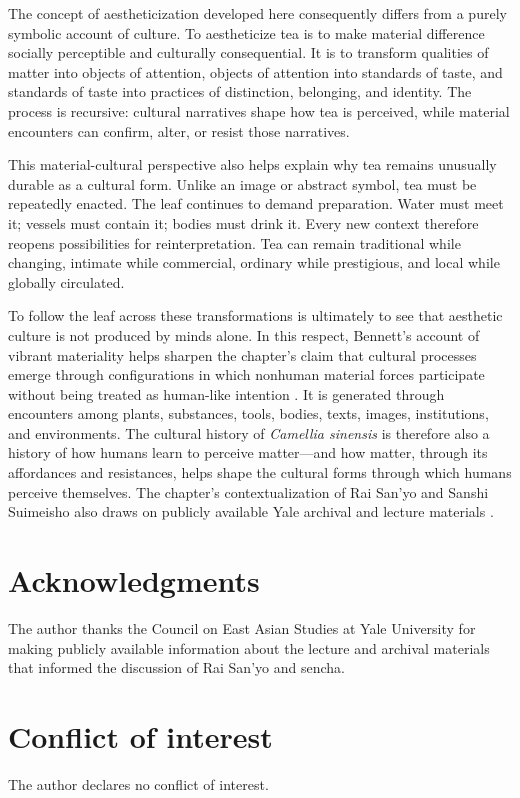 \documentclass[numbers]{IntechOpen-Book}
\begin{document}
\begin{backmatter}
The concept of aestheticization developed here consequently differs from a purely symbolic account of culture. To aestheticize tea is to make material difference socially perceptible and culturally consequential. It is to transform qualities of matter into objects of attention, objects of attention into standards of taste, and standards of taste into practices of distinction, belonging, and identity. The process is recursive: cultural narratives shape how tea is perceived, while material encounters can confirm, alter, or resist those narratives.

This material-cultural perspective also helps explain why tea remains unusually durable as a cultural form. Unlike an image or abstract symbol, tea must be repeatedly enacted. The leaf continues to demand preparation. Water must meet it; vessels must contain it; bodies must drink it. Every new context therefore reopens possibilities for reinterpretation. Tea can remain traditional while changing, intimate while commercial, ordinary while prestigious, and local while globally circulated.

To follow the leaf across these transformations is ultimately to see that aesthetic culture is not produced by minds alone. In this respect, Bennett's account of vibrant materiality helps sharpen the chapter's claim that cultural processes emerge through configurations in which nonhuman material forces participate without being treated as human-like intention \cite{bennett}. It is generated through encounters among plants, substances, tools, bodies, texts, images, institutions, and environments. The cultural history of \textit{Camellia sinensis} is therefore also a history of how humans learn to perceive matter---and how matter, through its affordances and resistances, helps shape the cultural forms through which humans perceive themselves. The chapter's contextualization of Rai San'yo and Sanshi Suimeisho also draws on publicly available Yale archival and lecture materials \cite{yale}.

\section*{Acknowledgments}
The author thanks the Council on East Asian Studies at Yale University for making publicly available information about the lecture and archival materials that informed the discussion of Rai San'yo and sencha.

\section*{Conflict of interest}
The author declares no conflict of interest.


\end{backmatter}
\end{document}

